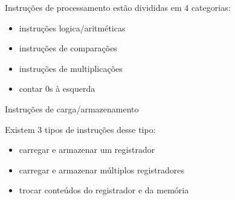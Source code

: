 Instruções de processamento estão divididas em 4 categorias:

\begin{itemize}
	\item instruções logica/aritméticas
	\item instruções de comparações
	\item instruções de multiplicações
	\item contar 0s à esquerda
\end{itemize}

Instruções de carga/armazenamento

Existem 3 tipos de instruções desse tipo:

\begin{itemize}
	\item carregar e armazenar um registrador
	\item carregar e armazenar múltiplos registradores
	\item trocar conteúdos do registrador e da memória
\end{itemize}

